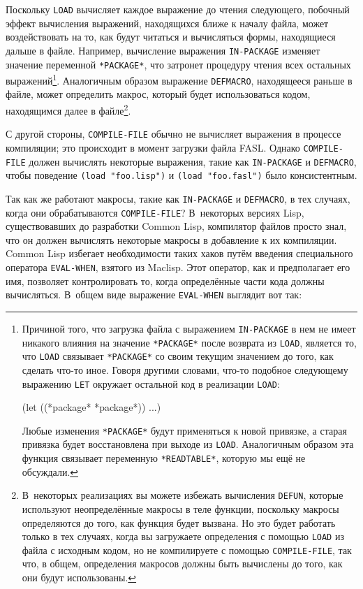 Поскольку \lstinline{LOAD} вычисляет каждое выражение до чтения следующего, побочный эффект
вычисления выражений, находящихся ближе к началу файла, может воздействовать на то, как
будут читаться и вычисляться формы, находящиеся дальше в файле.  Например, вычисление
выражения \lstinline{IN-PACKAGE} изменяет значение переменной \lstinline{*PACKAGE*}, что затронет
процедуру чтения всех остальных выражений\footnote{Причиной того, что загрузка файла с
  выражением \lstinline{IN-PACKAGE} в нем не имеет никакого влияния на значение
  \lstinline{*PACKAGE*} после возврата из \lstinline{LOAD}, является то, что \lstinline{LOAD} связывает
  \lstinline{*PACKAGE*} со своим текущим значением до того, как сделать что-то иное.  Говоря
  другими словами, что-то подобное следующему выражению \lstinline{LET} окружает остальной код
  в реализации \lstinline{LOAD}:

\begin{myverb}
(let ((*package* *package*)) ...)
\end{myverb}

Любые изменения \lstinline{*PACKAGE*} будут применяться к новой привязке, а старая привязка
будет восстановлена при выходе из \lstinline{LOAD}.  Аналогичным образом эта функция связывает
переменную \lstinline{*READTABLE*}, которую мы ещё не обсуждали.}\hspace{\footnotenegspace}.  Аналогичным образом
выражение \lstinline{DEFMACRO}, находящееся раньше в файле, может определить макрос, который
будет использоваться кодом, находящимся далее в файле\footnote{В~некоторых реализациях вы
  можете избежать вычисления \lstinline{DEFUN}, которые используют
  неопределённые макросы в теле функции, поскольку макросы определяются до того, как
  функция будет вызвана.  Но это будет работать только в тех случаях, когда вы загружаете
  определения с помощью \lstinline{LOAD} из файла с исходным кодом, но не компилируете с
  помощью \lstinline{COMPILE-FILE}, так что, в общем, определения макросов должны быть вычислены
  до того, как они будут использованы.}\hspace{\footnotenegspace}.

С другой стороны, \lstinline{COMPILE-FILE} обычно не вычисляет выражения в процессе компиляции;
это происходит в момент загрузки файла FASL. Однако \lstinline{COMPILE-FILE} должен вычислять
некоторые выражения, такие как \lstinline{IN-PACKAGE} и \lstinline{DEFMACRO}, чтобы поведение
\lstinline{(load "foo.lisp")} и \lstinline{(load "foo.fasl")} было консистентным.

Так как же работают макросы, такие как \lstinline{IN-PACKAGE} и \lstinline{DEFMACRO}, в тех случаях,
ког\-да они обрабатываются \lstinline{COMPILE-FILE}?  В~некоторых версиях Lisp, существовавших до
разработки Common Lisp, компилятор файлов просто знал, что он должен вычислять некоторые
макросы в добавление к их компиляции.  Common Lisp избегает необходимости таких хаков
путём введения специального оператора \lstinline{EVAL-WHEN}, взятого из Maclisp.  Этот оператор,
как и предполагает его имя, позволяет контролировать то, когда определённые части кода
должны вычисляться. В~общем виде выражение \lstinline{EVAL-WHEN} выглядит вот так:

